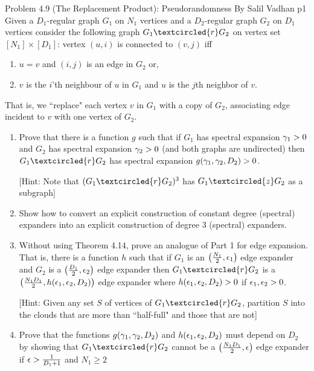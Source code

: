 \documentclass[a4paper, 11pt]{article}
\begin{document}
\begin{problem}{%
		Problem 4.9 (The Replacement Product): Pseudorandomness By Salil Vadhan
	}{p1%
}
Given a $D_1$-regular graph $G_1$ on $N_1$ vertices and a $D_2$-regular graph $G_2$ on $D_1$ vertices consider the following graph $G_1\textcircled{r}G_2$ on vertex set $[N_1]\times [D_1]$: vertex $(u,i)$ is connected to $(v,j)$ iff \begin{enumerate}[label=(\alph*)]
	\item $u=v$ and $(i,j)$ is an edge in $G_2$ or,
	\item $v$ is the $i$'th neighbour of $u$ in $G_1$ and $u$ is the $j$th neighbor of $v$. 
\end{enumerate}
That is, we ``replace" each vertex $v$ in $G_1$ with a copy of $G_2$, associating edge incident to $v$ with one vertex of $G_2$.
\begin{enumerate}
	\item Prove that there is a function $g$ such that if $G_1$ has spectral expansion $\gamma_1>0$ and $G_2$ has spectral expansion $\gamma_2>0$ (and both graphs are undirected) then $G_1\textcircled{r}G_2$ has spectral expansion $g(\gamma_1,\gamma_2,D_2)>0$.
	
	[Hint: Note that $(G_1\textcircled{r}G_2)^3$ has $G_1\textcircled{z}G_2$ as a subgraph]
	\item Show how to convert an explicit construction of constant degree (spectral) expanders into an explicit construction of degree 3 (spectral) expanders.
	\item Without using Theorem 4.14, prove an analogue of Part 1 for edge expansion. That is, there is a function $h$ such that if $G_1$ is an $\left(\frac{N_1}2,\epsilon_1\right)$ edge expander and $G_2$ is a $\left(\frac{D_1}2,\epsilon_2\right)$ edge expander then $G_1\textcircled{r}G_2$ is a $\left(\frac{N_1D_1}{2},h(\epsilon_1,\epsilon_2,D_2)\right)$ edge expander where $h(\epsilon_1,\epsilon_2,D_2)>0$ if $\epsilon_1,\epsilon_2>0$. 
	
	[Hint: Given any set $S$ of vertices of $G_1\textcircled{r}G_2$, partition $S$ into the clouds that are more than ``half-full" and those that are not]
	\item Prove that the functions $g(\gamma_1,\gamma_2,D_2)$ and $h(\epsilon_1,\epsilon_2,D_2)$ must depend on $D_2$ by showing that $G_1\textcircled{r}G_2$ cannot be a $\left(\frac{N_1D_1}2,\epsilon\right)$ edge expander if $\epsilon>\frac1{D_1+1}$ and $N_1\geq 2$
\end{enumerate}
\end{problem}
\end{document}

